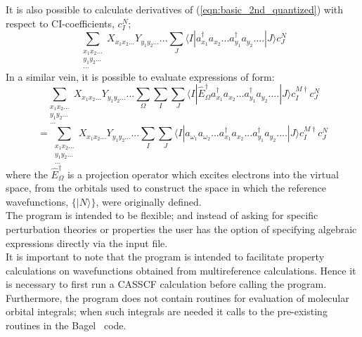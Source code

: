 \noindent It is also possible to calculate derivatives of (\ref{eqn:basic_2nd_quantized})  with respect to CI-coefficients, $c_{I}^{N}$;
\begin{equation}
\sum_{\substack{ x_{1}x_{2}...\\ y_{1}y_{2}... \\ ...}} X_{x_{1}x_{2}...} Y_{y_{1}y_{2}...} ...
\sum_{J}
\langle I | a^{\dagger}_{x_{1}} a_{x_{2}}...a^{\dagger}_{y_{1}}a_{y_{2}}....| J \rangle 
c^{N}_{J}
\label{eqn:ci_derivative}
\end{equation}
\noindent In a similar vein, it is possible to evaluate expressions of form:
\begin{equation*}
\sum_{\substack{ x_{1}x_{2}...\\ y_{1}y_{2}... \\ ...}} X_{x_{1}x_{2}...} Y_{y_{1}y_{2}...} ...
\sum_{\Omega}
\sum_{I}\sum_{J}
\langle I | \hat{E}^{\dagger}_{\Omega} a^{\dagger}_{x_{1}} a_{x_{2}}...a^{\dagger}_{y_{1}}a_{y_{2}}....| J \rangle 
 c^{M \dagger}_{I}c^{N}_{J}
\end{equation*}
\begin{equation}
=
\sum_{\substack{ x_{1}x_{2}...\\ y_{1}y_{2}... \\ ...}} X_{x_{1}x_{2}...} Y_{y_{1}y_{2}...} ...
\sum_{I}\sum_{J}
\langle I | a_{\omega_{1}} a_{\omega_{2}}.. .a^{\dagger}_{x_{1}} a_{x_{2}}...a^{\dagger}_{y_{1}}a_{y_{2}}....| J \rangle 
 c^{M \dagger}_{I}c^{N}_{J}
\label{eqn:basic_2nd_quantized_projector}
\end{equation}
\noindent where the $\hat{E}^{\dagger}_{\Omega}$ is a projection operator
which excites electrons into the virtual space, from the orbitals used to construct
the space in which the reference wavefunctions, $\{|N\rangle\}$, were originally defined.\\

\noindent The program is intended to be flexible; and instead of asking for
specific perturbation theories or properties the user has the option of
specifying algebraic expressions directly via the input file.\\

\noindent It is important to note that the program is intended to facilitate property 
calculations on wavefunctions obtained from multireference calculations. Hence it
is necessary to first run a CASSCF calculation before calling the program. Furthermore,
the program does not contain routines for evaluation of molecular orbital integrals;
when such integrals are needed it calls to the pre-existing routines in the 
Bagel~\cite{BAGEL} code.

